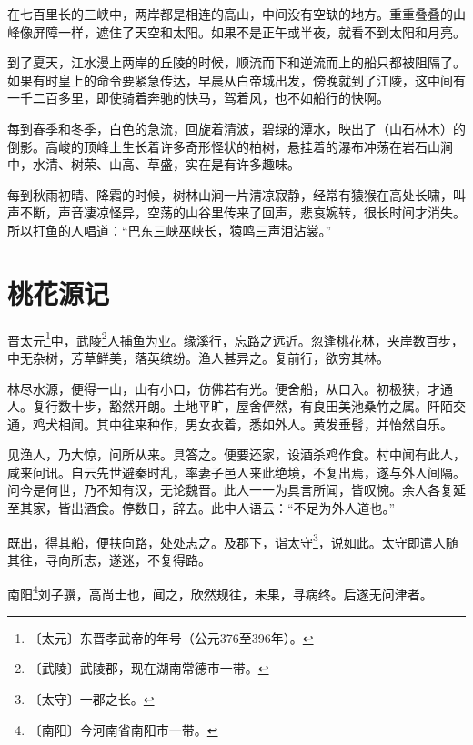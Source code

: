 \documentclass[12pt,UTF-8,openany,a4]{ctexbook}
\begin{document}
\begin{large}
    \yiwen 
    在七百里长的三峡中，两岸都是相连的高山，中间没有空缺的地方。重重叠叠的山峰像屏障一样，遮住了天空和太阳。如果不是正午或半夜，就看不到太阳和月亮。
    
    到了夏天，江水漫上两岸的丘陵的时候，顺流而下和逆流而上的船只都被阻隔了。 如果有时皇上的命令要紧急传达，早晨从白帝城出发，傍晚就到了江陵，这中间有一千二百多里，即使骑着奔驰的快马，驾着风，也不如船行的快啊。
    
    每到春季和冬季，白色的急流，回旋着清波，碧绿的潭水，映出了（山石林木）的倒影。高峻的顶峰上生长着许多奇形怪状的柏树，悬挂着的瀑布冲荡在岩石山涧中，水清、树荣、山高、草盛，实在是有许多趣味。
    
    每到秋雨初晴、降霜的时候，树林山涧一片清凉寂静，经常有猿猴在高处长啸，叫声不断，声音凄凉怪异，空荡的山谷里传来了回声，悲哀婉转，很长时间才消失。所以打鱼的人唱道：“巴东三峡巫峡长，猿鸣三声泪沾裳。”
    
\end{large}



\chapter{桃花源记}

\begin{large}
    
    晋太元\footnote{〔太元〕\yiwen 东晋孝武帝的年号（公元376至396年）。}中，武陵\footnote{〔武陵〕\yiwen 武陵郡，现在湖南常德市一带。}人捕鱼为业。缘溪行，忘路之远近。忽逢桃花林，夹岸数百步，中无杂树，芳草鲜美，落英缤纷。渔人甚异之。复前行，欲穷其林。
    
    林尽水源，便得一山，山有小口，仿佛若有光。便舍船，从口入。初极狭，才通人。复行数十步，豁然开朗。土地平旷，屋舍俨然，有良田美池桑竹之属。阡陌交通，鸡犬相闻。其中往来种作，男女衣着，悉如外人。黄发垂髫，并怡然自乐。
    
    见渔人，乃大惊，问所从来。具答之。便要还家，设酒杀鸡作食。村中闻有此人，咸来问讯。自云先世避秦时乱，率妻子邑人来此绝境，不复出焉，遂与外人间隔。问今是何世，乃不知有汉，无论魏晋。此人一一为具言所闻，皆叹惋。余人各复延至其家，皆出酒食。停数日，辞去。此中人语云：“不足为外人道也。”
    
    既出，得其船，便扶向路，处处志之。及郡下，诣太守\footnote{〔太守〕\yiwen 一郡之长。}，说如此。太守即遣人随其往，寻向所志，遂迷，不复得路。
    
    南阳\footnote{〔南阳〕\yiwen 今河南省南阳市一带。}刘子骥，高尚士也，闻之，欣然规往，未果，寻病终。后遂无问津者。
\end{large}
\end{document}
